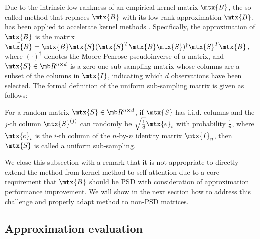 Due to the intrinsic low-rankness of an empirical kernel matrix $\mtx{B}$, the so-called \nystrom method that replaces $\mtx{B}$ with its low-rank approximation $\tilde{\mtx{B}}$, has been applied to accelerate kernel methods \citep{gittens2016revisiting, kumar2009sampling, williams2001using}. 
Specifically, the \nystrom approximation of $\mtx{B}$ is the matrix $\tilde{\mtx{B}} = \mtx{B} \mtx{S}(\mtx{S}^T \mtx{B} \mtx{S})^\dagger \mtx{S}^T \mtx{B}$,
where $(\cdot)^\dagger$ denotes the Moore-Penrose pseudoinverse of a matrix, and $\mtx{S} \in \mb R^{n \times d}$ is a zero-one sub-sampling matrix whose columns are a subset of the columns in $\mtx{I}$, indicating which $d$ observations have been selected. 
The formal definition of the uniform sub-sampling matrix is given as follows:
\begin{definition}
\label{def:subsampling}
For a random matrix $\mtx{S} \in \mb R^{n \times d}$, if $\mtx{S}$ has i.i.d. columns and the $j$-th column $\mtx{S}^{(j)}$ can randomly be $\sqrt{\frac{1}{d}} \mtx{e}_i$ with probability $\frac1n$,
where $\mtx{e}_i$ is the $i$-th column of the $n$-by-$n$ identity matrix $\mtx{I}_n$, 
then $\mtx{S}$ is called a uniform sub-sampling.
\end{definition}

We close this subsection with a remark that it is not appropriate to directly extend the \nystrom method from kernel method to self-attention due to a core requirement that $\mtx{B}$ should be PSD with consideration of approximation performance improvement.
We will show in the next section how to address this challenge and properly adapt \nystrom method to non-PSD matrices.


\subsection{Approximation evaluation}

